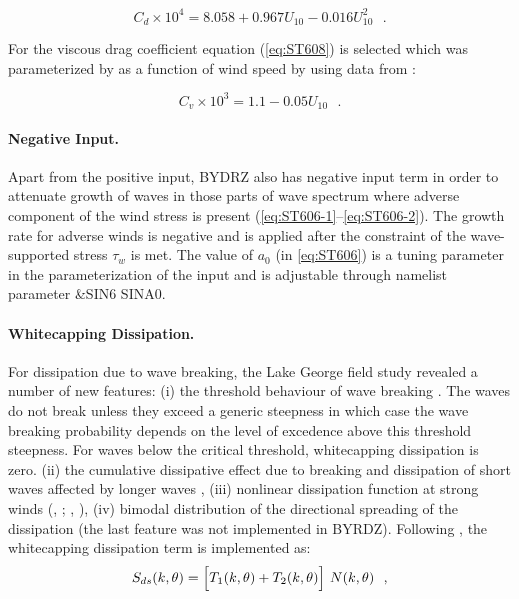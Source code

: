 \begin{equation}\label{eq:ST607}
C_d \times 10^4 = 8.058 + 0.967 U_{10} - 0.016 U_{10}^2 \:\:\: .
\end{equation}

\noindent
For the viscous drag coefficient equation (\ref{eq:ST608}) is selected which
was parameterized by \citet{art:Tea10} as a function of wind speed by using
data from \citet{art:BP98}:

\begin{equation}\label{eq:ST608}
  C_v \times 10^3 = 1.1 - 0.05 U_{10} \:\:\: .
\end{equation}


\paragraph{Negative Input.} Apart from the positive input, BYDRZ also has
negative input term in order to attenuate growth of waves in those parts
of wave spectrum where adverse component of the wind stress is present
(\ref{eq:ST606-1}--\ref{eq:ST606-2}). The growth rate for adverse winds
is negative \citep{pro:Don99} and is applied after the constraint of
the wave-supported stress $\tau_w$ is met. The value of $a_0$
(in \ref{eq:ST606}) is a tuning parameter in the parameterization of the
input and is adjustable through namelist parameter {\code \&SIN6 SINA0}.



\noindent
\paragraph{Whitecapping Dissipation.} For dissipation due to wave breaking,
the Lake George field study revealed a number of new features: (i) the
threshold behaviour of wave breaking \citep{art:BBY01}. The waves do not
break unless they exceed a generic steepness in which case the wave breaking
probability depends on the level of excedence above this threshold steepness.
For waves below the critical threshold, whitecapping dissipation is zero.
(ii) the cumulative dissipative effect due to breaking and dissipation of
short waves affected by longer waves 
\citep{pro:Don01,pro:BY05,art:Mea06,art:YB06,art:Bea10},
(iii) nonlinear dissipation function at strong winds
(\citeauthor{art:Mea06}, \citeyear{art:Mea06};\linebreak
 \citeauthor{art:Bea07}, \citeyear{art:Bea07}),
(iv) bimodal distribution of the directional spreading of the dissipation
\citep{art:YB06,art:Bea10} (the last feature was not implemented in BYRDZ).
Following \citet{art:RBW12}, the whitecapping dissipation term is
implemented as:
\begin{equation}\label{eq:ST620}
  S_{ds}(k,\theta) = \Bigl [ T_1(k,\theta) + T_2(k,\theta) \Bigr ]\ N(k,\theta) \:\:\: ,
\end{equation}

